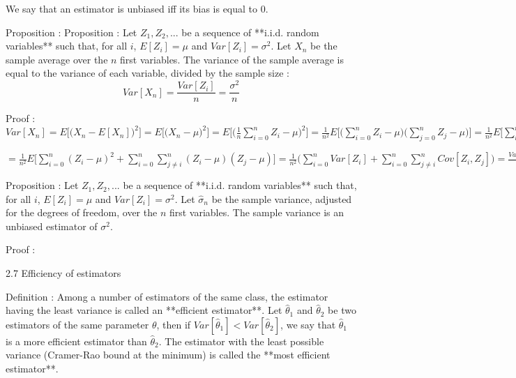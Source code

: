 We say that an estimator is unbiased iff its bias is equal to 0.

Proposition : Proposition : Let $Z_1, Z_2, ...$ be a sequence of **i.i.d. random variables** such that, for all $i$, $E[Z_i] = \mu$ and $Var[Z_i] = \sigma^2$. Let $X_n$ be the sample average over the $n$ first variables. The variance of the sample average is equal to the variance of each variable, divided by the sample size : $$ Var[X_n] = \frac{Var[Z_i]}{n} = \frac{\sigma^2}{n} $$

Proof : $Var[X_n] = E\big[\big(X_n - E[X_n]\big)^2\big] = E\big[\big(X_n - \mu\big)^2\big] = E\big[\big(\frac{1}{n}\sum_{i=0}^{n} Z_i - \mu\big)^2\big] = \frac{1}{n^2}E\big[\big(\sum_{i=0}^{n} Z_i - \mu\big)\big(\sum_{j=0}^{n} Z_j - \mu\big)\big]=\frac{1}{n^2}E\big[\sum_{i=0}^{n}\sum_{j=0}^{n} (Z_i - \mu)( Z_j - \mu)\big] $

$=\frac{1}{n^2}E\big[\sum_{i=0}^{n}(Z_i - \mu)^2 + \sum_{i=0}^{n}\sum_{j\neq i}^{n} (Z_i - \mu)( Z_j - \mu)\big] = \frac{1}{n^2}\big(\sum_{i=0}^{n}Var[Z_i] + \sum_{i=0}^{n}\sum_{j\neq i}^{n}Cov[Z_i, Z_j] \big) = \frac{Var[Z_i]}{n} = \frac{\sigma^2}{n}$

Proposition : Let $Z_1, Z_2, ...$ be a sequence of **i.i.d. random variables** such that, for all $i$, $E[Z_i] = \mu$ and $Var[Z_i] = \sigma^2$. Let $\hat{\sigma}_n$ be the sample variance, adjusted for the degrees of freedom, over the $n$ first variables. The sample variance is an unbiased estimator of $\sigma^2$.

Proof : 

2.7 Efficiency of estimators

Definition : Among a number of estimators of the same class, the estimator having the least variance is called an **efficient estimator**. Let $\hat{\theta}_1$ and $\hat{\theta}_2$ be two estimators of the same parameter $\theta$, then if $Var[\hat{\theta}_1] < Var[\hat{\theta}_2]$, we say that $\hat{\theta}_1$ is a more efficient estimator than $\hat{\theta}_2$. The estimator with the least possible variance (Cramer-Rao bound at the minimum) is called the **most efficient estimator**.